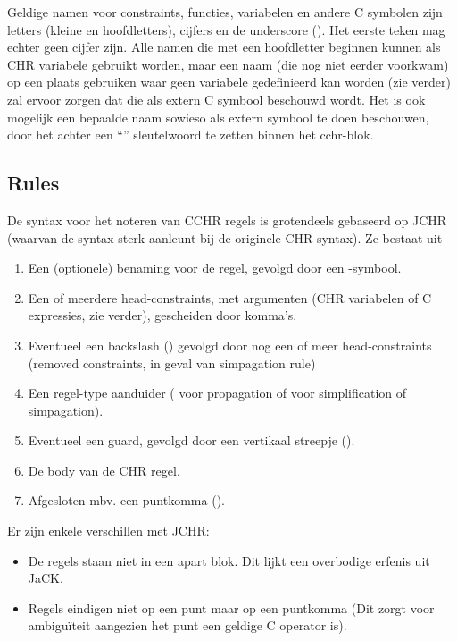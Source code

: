 Geldige namen voor constraints, functies, variabelen en andere C symbolen zijn letters (kleine en hoofdletters), cijfers en de underscore (\code{\_}). Het eerste teken mag echter geen cijfer zijn. Alle namen die met een hoofdletter beginnen kunnen als CHR variabele gebruikt worden, maar een naam (die nog niet eerder voorkwam) op een plaats gebruiken waar geen variabele gedefinieerd kan worden (zie verder) zal ervoor zorgen dat die als extern C symbool beschouwd wordt. Het is ook mogelijk een bepaalde naam sowieso als extern symbool te doen beschouwen, door het achter een ``'' sleutelwoord te zetten binnen het cchr-blok.

\subsection{Rules}

De syntax voor het noteren van CCHR regels is grotendeels gebaseerd op JCHR (waarvan de syntax sterk aanleunt bij de
originele CHR syntax). Ze bestaat uit \begin{enumerate}
  \item Een (optionele) benaming voor de regel, gevolgd door een -symbool.
  \item Een of meerdere head-constraints, met argumenten (CHR variabelen of C expressies, zie verder), gescheiden door komma's.
  \item Eventueel een backslash (\code{$\backslash$}) gevolgd door nog een of meer head-constraints (removed constraints, in geval van simpagation rule)
  \item Een regel-type aanduider (\code{==>} voor propagation of \code{<=>} voor simplification of simpagation).
  \item Eventueel een guard, gevolgd door een vertikaal streepje (\code{|}).
  \item De body van de CHR regel.
  \item Afgesloten mbv. een puntkomma (\code{;}).
\end{enumerate}

Er zijn enkele verschillen met JCHR: \begin{itemize}
  \item De regels staan niet in een apart  blok. Dit lijkt een overbodige erfenis uit JaCK.
  \item Regels eindigen niet op een punt maar op een puntkomma (Dit zorgt voor ambigu\"iteit aangezien het punt een geldige
        C operator is).
\end{itemize}

